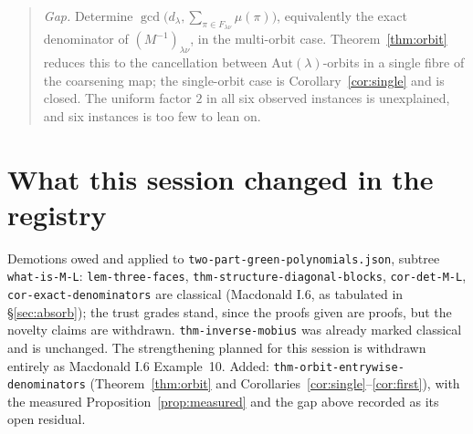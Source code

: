 \documentclass[11pt]{article}
\theoremstyle{definition}
\newcommand{\lam}{\lambda}
\newcommand{\Aut}{\mathrm{Aut}}
\begin{document}
\begin{quote}
\emph{Gap.} Determine $\gcd\bigl(d_\lam,\sum_{\pi\in F_{\lam\nu}}\mu(\pi)\bigr)$, equivalently the
exact denominator of $(M^{-1})_{\lam\nu}$, in the multi-orbit case. Theorem~\ref{thm:orbit} reduces
this to the cancellation between $\Aut(\lam)$-orbits in a single fibre of the coarsening map; the
single-orbit case is Corollary~\ref{cor:single} and is closed. The uniform factor $2$ in all six
observed instances is unexplained, and six instances is too few to lean on.
\end{quote}

\section{What this session changed in the registry}

Demotions owed and applied to \texttt{two-part-green-polynomials.json}, subtree
\texttt{what-is-M-L}: \texttt{lem-three-faces}, \texttt{thm-structure-diagonal-blocks},
\texttt{cor-det-M-L}, \texttt{cor-exact-denominators} are classical (Macdonald I.6, as tabulated in
\S\ref{sec:absorb}); the trust grades stand, since the proofs given are proofs, but the novelty
claims are withdrawn. \texttt{thm-inverse-mobius} was already marked classical and is unchanged. The
strengthening planned for this session is withdrawn entirely as Macdonald I.6 Example~10. Added:
\texttt{thm-orbit-entrywise-denominators} (Theorem~\ref{thm:orbit} and
Corollaries~\ref{cor:single}--\ref{cor:first}), with the measured Proposition~\ref{prop:measured} and
the gap above recorded as its open residual.
\end{document}
